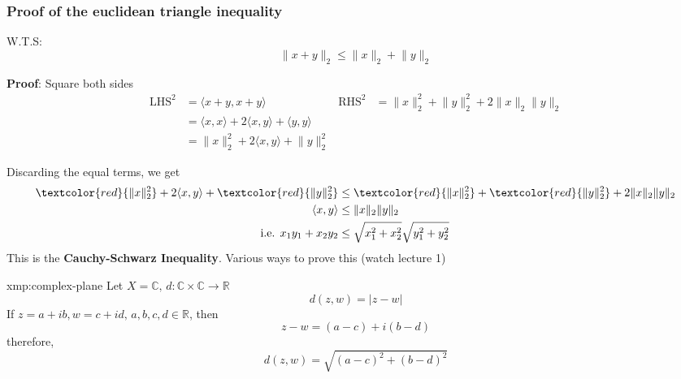 \documentclass{article}
\begin{document}
\subsubsection{Proof of the euclidean triangle inequality}
W.T.S: 
\[\lVert x+y \rVert_{2} \le \lVert x \rVert_{2} + \lVert y \rVert_{2}\]

\textbf{Proof}: Square both sides
\begin{align*}
    \text{LHS}^{2} &= \langle x + y, x + y \rangle  & \text{RHS}^{2}&= \lVert x \rVert^{2}_{2} + \lVert y \rVert^{2}_{2} + 2\lVert x \rVert_{2}\lVert y \rVert_{2}\\
                   &= \langle x,x \rangle + 2\langle x,y \rangle + \langle y,y \rangle \\
                   & = \lVert x \rVert^{2}_{2} + 2\langle x,y \rangle + \lVert y \rVert^{2}_{2}
\end{align*}
\newpage

Discarding the equal terms, we get
\begin{align*}
    \textcolor{red}{\lVert x \rVert^{2}_{2}} + 2\langle x,y \rangle + \textcolor{red}{\lVert y \rVert^{2}_{2}} &\le \textcolor{red}{\lVert x \rVert^{2}_{2}} + \textcolor{red}{\lVert y \rVert^{2}_{2}} + 2\lVert x \rVert_{2}\lVert y \rVert_{2}\\
    \langle x,y \rangle &\le \lVert x \rVert_{2}\lVert y \rVert_{2} \\
    \text{i.e. } x_{1}y_{1} + x_{2}y_{2} &\le \sqrt{x^{2}_{1} + x^{2}_{2}}\sqrt{y^{2}_{1}+y^{2}_{2}}
\end{align*}
This is the \textbf{Cauchy-Schwarz Inequality}. Various ways to prove this (watch lecture 1)

\begin{xmp}{xmp:complex-plane}{}
    Let $X = \mathbb{C},\, d: \mathbb{C} \times \mathbb{C} \to \mathbb{R} $
    \[d(z,w) = \lvert z - w \rvert\]
    If $z = a+ib, w = c+id,\, a,b,c,d\in\mathbb{R}$, then
    \[z - w = (a - c) + i(b - d)\]
    therefore,
    \[d(z,w) = \sqrt{(a-c)^{2} + (b-d)^{2}}\]
\end{xmp}
\end{document}
